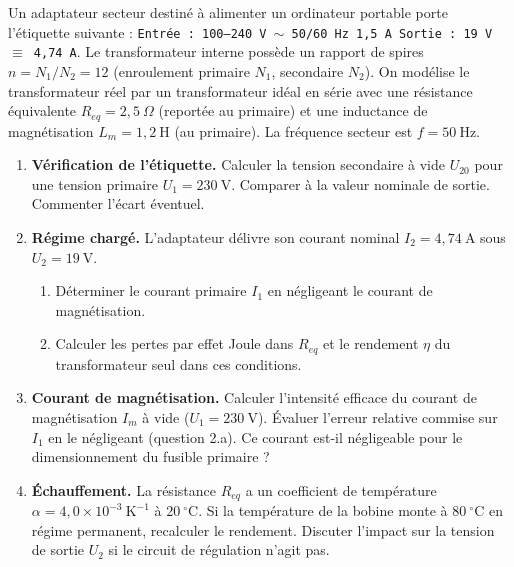 \documentclass[11pt]{article}
\begin{document}
\begin{exercice}
Un adaptateur secteur destiné à alimenter un ordinateur portable porte l'étiquette suivante : 
\texttt{Entrée : 100--240 V $\sim$ 50/60 Hz 1,5 A \quad Sortie : 19 V $\equiv$ 4,74 A}.
Le transformateur interne possède un rapport de spires $n = N_1/N_2 = 12$ (enroulement primaire $N_1$, secondaire $N_2$). On modélise le transformateur réel par un transformateur idéal en série avec une résistance équivalente $R_{eq} = 2,5~\Omega$ (reportée au primaire) et une inductance de magnétisation $L_m = 1,2~\mathrm{H}$ (au primaire). La fréquence secteur est $f = 50~\mathrm{Hz}$.
\begin{enumerate}
    \item \textbf{Vérification de l'étiquette.} Calculer la tension secondaire à vide $U_{20}$ pour une tension primaire $U_1 = 230~\mathrm{V}$. Comparer à la valeur nominale de sortie. Commenter l'écart éventuel.
    \item \textbf{Régime chargé.} L'adaptateur délivre son courant nominal $I_2 = 4,74~\mathrm{A}$ sous $U_2 = 19~\mathrm{V}$. 
    \begin{enumerate}
        \item Déterminer le courant primaire $I_1$ en négligeant le courant de magnétisation.
        \item Calculer les pertes par effet Joule dans $R_{eq}$ et le rendement $\eta$ du transformateur seul dans ces conditions.
    \end{enumerate}
    \item \textbf{Courant de magnétisation.} Calculer l'intensité efficace du courant de magnétisation $I_m$ à vide ($U_1 = 230~\mathrm{V}$). Évaluer l'erreur relative commise sur $I_1$ en le négligeant (question 2.a). Ce courant est-il négligeable pour le dimensionnement du fusible primaire ?
    \item \textbf{Échauffement.} La résistance $R_{eq}$ a un coefficient de température $\alpha = 4,0 \times 10^{-3}~\mathrm{K^{-1}}$ à $20~^\circ\mathrm{C}$. Si la température de la bobine monte à $80~^\circ\mathrm{C}$ en régime permanent, recalculer le rendement. Discuter l'impact sur la tension de sortie $U_2$ si le circuit de régulation n'agit pas.
\end{enumerate}
\end{exercice}
\end{document}
